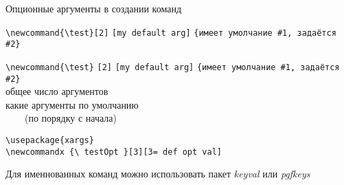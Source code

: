 \begin{frame}[fragile]{Опционные аргументы в создании команд\magicPage }\relax
    \footnotesize
     \begin{tabbing}
     
        \lstinline|\newcommand{\test}|\= \lstinline|[2]| \= \lstinline|[my default arg]| \= \lstinline|{имеет умолчание #1, задаётся #2}|\kill

        \lstinline|\newcommand{\test}|\> \lstinline|[2]| \> \lstinline|[my default arg]| \> \lstinline|{имеет умолчание #1, задаётся #2}| \\ \footnotesize
        \>\footnotesize общее число аргументов  \> \> \\ 
        \>  \>\footnotesize какие аргументы по умолчанию \> \\
        \> \>~~~~(по порядку с начала) \>
    \end{tabbing}
    
    \vspace{-3ex}
    \lstinline|\usepackage{xargs}|\\ 
    \lstinline|\newcommandx {\ testOpt }[3][3= def opt val]|
    
    Для именнованных команд можно использовать пакет \textit{keyval} или \textit{pgfkeys}
    
     
\end{frame}

